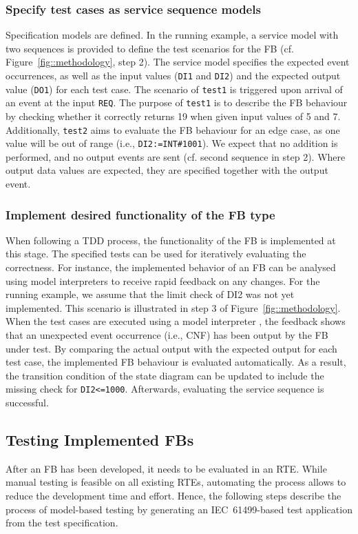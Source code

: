 \begin{bibunit}
\subsubsection{Specify test cases as service sequence models}
Specification models are defined. In the running example, a service model with two sequences is provided to define the test scenarios for the FB (cf. Figure~\ref{fig::methodology}, step 2). The service model specifies the expected event occurrences, as well as the input values (\texttt{DI1} and \texttt{DI2}) and the expected output value (\texttt{DO1}) for each test case.  
The scenario of \texttt{test1} is triggered upon arrival of an event at the input \texttt{REQ}. The purpose of \texttt{test1} is to describe the FB behaviour by checking whether it correctly returns 19 when given input values of 5 and 7. 
Additionally, \texttt{test2} aims to evaluate the FB behaviour for an edge case, as one value will be out of range (i.e., \texttt{DI2:=INT\#1001}). We expect that no addition is performed, and no output events are sent (cf. second sequence in step 2). 
Where output data values are expected, they are specified together with the output event.

\subsubsection{Implement desired functionality of the FB type}
When following a TDD process, the functionality of the FB is implemented at this stage. The specified tests can be used for iteratively evaluating the correctness. For instance, the implemented behavior of an FB can be analysed using model interpreters to receive rapid feedback on any changes. 
For the running example, we assume that the limit check of DI2 was not yet implemented. This scenario is illustrated in step 3 of Figure~\ref{fig::methodology}. When the test cases are executed using a model interpreter \cite{wiesmayr2021}, the feedback shows that an unexpected event occurrence (i.e., CNF) has been output by the FB under test. 
By comparing the actual output with the expected output for each test case, the implemented FB behaviour is evaluated automatically.
As a result, the transition condition of the state diagram can be updated to include the missing check for \texttt{DI2<=1000}. Afterwards, evaluating the service sequence is successful.

\subsection{Testing Implemented FBs}
After an FB has been developed, it needs to be evaluated in an RTE. While manual testing is feasible on all existing RTEs, automating the process allows to reduce the development time and effort. Hence, the following steps describe the process of model-based testing by generating an IEC~61499-based test application from the test specification.


\end{bibunit}
